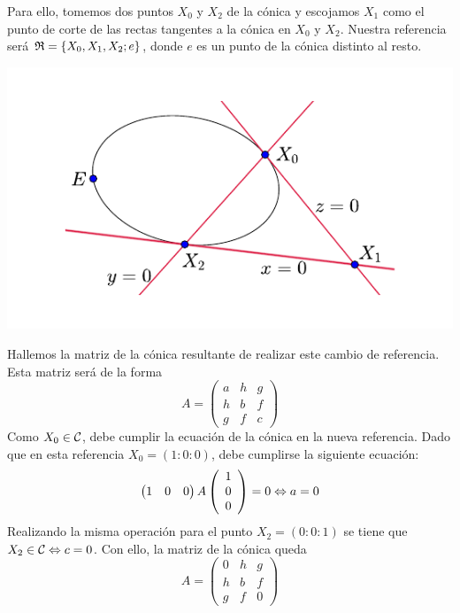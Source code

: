 Para ello, tomemos dos puntos $X_0$ y $X_2$ de la cónica y escojamos $X_1$ como el punto de corte de las rectas tangentes a la cónica en $X_0$ y $X_2$. Nuestra referencia será $\mathfrak{R}=\{X_0,X_1,X_2;e\}$, donde $e$ es un punto de la cónica distinto al resto.
\begin{center}
	\includegraphics[scale=.9]{Graficos/Conicas/Parametrizacionparabola}
\end{center}
Hallemos la matriz de la cónica resultante de realizar este cambio de referencia. Esta matriz será de la forma
\begin{equation*}
	A=\left( \begin{array}{ccc}
	a & h & g\\
	h & b & f\\
	g & f & c
	\end{array}\right) 
\end{equation*}
Como $X_0\in \mathcal{C}$, debe cumplir la ecuación de la cónica en la nueva referencia. Dado que en esta referencia $X_0=(1:0:0)$, debe cumplirse la siguiente ecuación:
\begin{equation*}
	\begin{pmatrix}
		1 & 0 & 0
	\end{pmatrix}A 
	\left( \begin{array}{c}
		1\\0\\0
	\end{array}\right) =0\Leftrightarrow a=0
\end{equation*}
Realizando la misma operación para el punto $X_2=(0:0:1)$ se tiene que $X_2\in \mathcal{C}\Leftrightarrow c=0$. Con ello, la matriz de la cónica queda
\begin{equation*}
	A=\left( \begin{array}{ccc}
		0 & h & g\\
		h & b & f\\
		g & f & 0
	\end{array}\right) 
\end{equation*}
